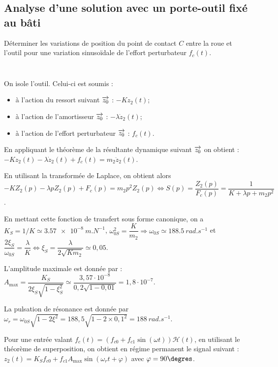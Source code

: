 \documentclass[10pt,fleqn]{article} %
\begin{document}
\subsection{Analyse d’une solution avec un porte-outil fixé au bâti}
\begin{obj}
Déterminer les variations de position du point de contact $C$ entre la roue et l’outil pour une variation
sinusoïdale de l’effort perturbateur $f_c(t)$.
\end{obj}


\subparagraph{} %
~\\

On isole l'outil. Celui-ci est soumis :
\begin{itemize}
\item à l'action du ressort suivant $\overrightarrow{z_0}$ : $-Kz_2(t)$;
\item à l'action de l'amortisseur $\overrightarrow{z_0}$ : $-\lambda \dot{z}_2(t)$;
\item à l'action de l'effort perturbateur $\overrightarrow{z_0}$ : $f_c(t)$. 
\end{itemize}

En appliquant le théorème de la résultante dynamique suivant $\overrightarrow{z_0}$ on obtient : $-Kz_2(t)-\lambda \dot{z}_2(t)+f_c(t)=m_2\ddot{z}_2(t)$.

En utilisant la transformée de Laplace, on obtient alors 
$-KZ_2(p)-\lambda p{Z}_2(p)+F_c(p)=m_2p^2{Z}_2(p) \Leftrightarrow S(p)=\dfrac{Z_2(p)}{F_c(p)}=\dfrac{1}{K+\lambda p  + m_2 p^2}
$.

En mettant cette fonction de transfert sous forme canonique, on a 
$K_S =1/K \simeq \SI{3,57e-8}{m.N^{-1}}$, 
$\omega_{0S}^2 = \dfrac{K}{m_2} \Rightarrow \omega_{0S}\simeq \SI{188,5}{rad.s^{-1}}$ et 
$\dfrac{2\xi_S}{\omega_{0S}} = \dfrac{\lambda}{K} \Leftrightarrow \xi_S = \dfrac{\lambda }{2\sqrt{Km_2}} \simeq 0,05$.

L'amplitude maximale est donnée par : $A_{\text{max}}=\dfrac{K_S}{2\xi_S\sqrt{1-\xi_S^2}}\simeq \dfrac{3,57\cdot 10^{-8}}{0,2\sqrt{1-0,01}}=1,8\cdot 10^{-7}$.



La pulsation de résonance est donnée par $\omega_r = \omega_{0S} \sqrt{1-2\xi^2} = 188,5\sqrt{1-2\times 0,1^2}=\SI{188}{rad.s^{-1}}$.



Pour une entrée valant $f_c(t)=\left(f_{c0}+f_{c1}\sin \left(\omega t\right)\right) \mathcal{H}(t)$, en utilisant le théorème de superposition, on obtient en régime permanent le signal suivant : 
$z_2(t)=K_S f_{c0}  + f_{c1} A_{\text{max}} \sin \left(\omega_r t+\varphi\right)$ avec $\varphi=90\degres$.
\end{document}

